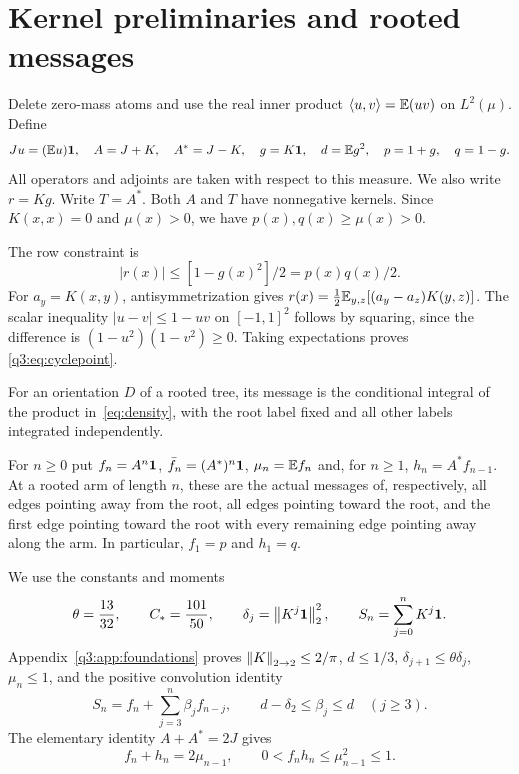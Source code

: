 \section{Kernel preliminaries and rooted messages}\label{sec:prelim}\label{q3:sec:method}
Delete zero-mass atoms and use the real inner product $\left\langle u,v\right\rangle=\mathbb E(uv)$ on $L^2(\mu)$. Define
\begin{equation}\label{q3:eq:notation}
 Ju=(\mathbb E u)\mathbf1,\quad A=J+K,\quad A^*=J-K,\quad
 g=K\mathbf1,\quad d=\mathbb E g^2,\quad p=1+g,\quad q=1-g.
\end{equation}
All operators and adjoints are taken with respect to this measure. We also write $r=Kg$. Write $T=A^*$. Both $A$ and $T$ have nonnegative kernels. Since $K(x,x)=0$ and $\mu(x)>0$, we have $p(x),q(x)\ge\mu(x)>0$.

The row constraint is
\begin{equation}\label{q3:eq:cyclepoint}
 |r(x)|\le[1-g(x)^2]/2=p(x)q(x)/2.
\end{equation}
For $a_y=K(x,y)$, antisymmetrization gives
$r(x)=\frac12\mathbb E_{y,z}[(a_y-a_z)K(y,z)]$.
The scalar inequality $|u-v|\le1-uv$ on $[-1,1]^2$ follows by squaring,
since the difference is $(1-u^2)(1-v^2)\ge0$.
Taking expectations proves \eqref{q3:eq:cyclepoint}.

For an orientation $D$ of a rooted tree, its message is the conditional integral of the product in~\eqref{eq:density}, with the root label fixed and all other labels integrated independently.

For $n\ge0$ put $f_n=A^n\mathbf1$, $\bar f_n=(A^*)^n\mathbf1$, $\mu_n=\mathbb E f_n$ and, for $n\ge1$, $h_n=A^*f_{n-1}$. At a rooted arm of length $n$, these are the actual messages of, respectively, all edges pointing away from the root, all edges pointing toward the root, and the first edge pointing toward the root with every remaining edge pointing away along the arm. In particular, $f_1=p$ and $h_1=q$.

We use the constants and moments
\begin{equation}\label{q3:eq:constants}
 \theta=\frac{13}{32},\qquad C_*=\frac{101}{50},\qquad
 \delta_j=\left\lVert K^j\mathbf1\right\rVert_2^2,\qquad S_n=\sum_{j=0}^nK^j\mathbf1.
\end{equation}
Appendix~\ref{q3:app:foundations} proves $\left\lVert K\right\rVert_{2\to2}\le2/\pi$, $d\le1/3$, $\delta_{j+1}\le\theta \delta_{j}$, $\mu_n\le1$, and the positive convolution identity
\begin{equation}\label{q3:eq:convolution}
 S_n=f_n+\sum_{j=3}^n\beta_jf_{n-j},\qquad
 d-\delta_{2}\le\beta_j\le d\quad(j\ge3).
\end{equation}
The elementary identity $A+A^*=2J$ gives
\begin{equation}\label{q3:eq:equalpair}
 f_n+h_n=2\mu_{n-1},\qquad 0<f_nh_n\le\mu_{n-1}^2\le1.
\end{equation}

